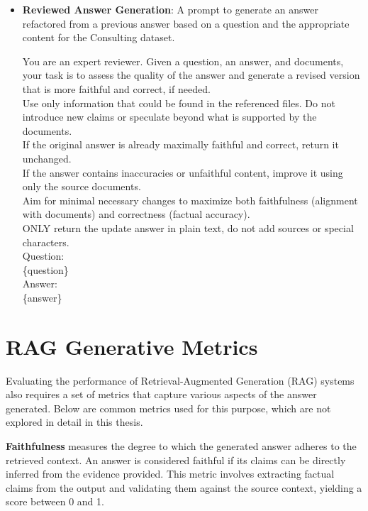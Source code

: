 \documentclass[12pt,twoside]{report}
\begin{document}
\begin{itemize}
    \item \textbf{Reviewed Answer Generation}: A prompt to generate an answer refactored from a previous answer based on a question and the appropriate content for the Consulting dataset.
    \begin{colquote}
    You are an expert reviewer. Given a question, an answer, and documents, your task is to assess the quality of the answer and generate a revised version that is more faithful and correct, if needed. \\
    Use only information that could be found in the referenced files. Do not introduce new claims or speculate beyond what is supported by the documents. \\
    If the original answer is already maximally faithful and correct, return it unchanged. \\
    If the answer contains inaccuracies or unfaithful content, improve it using only the source documents. \\
    Aim for minimal necessary changes to maximize both faithfulness (alignment with documents) and correctness (factual accuracy). \\
    ONLY return the update answer in plain text, do not add sources or special characters. \\

    Question: \\
    \{question\} \\

    Answer: \\
    \{answer\}
    \end{colquote}
\end{itemize}

\section{RAG Generative Metrics}
\label{sec:rag_generative_metrics}

Evaluating the performance of Retrieval-Augmented Generation (RAG) systems also requires a set of metrics that capture various aspects of the answer generated. Below are common metrics used for this purpose, which are not explored in detail in this thesis.

\textbf{Faithfulness} measures the degree to which the generated answer adheres to the retrieved context. An answer is considered faithful if its claims can be directly inferred from the evidence provided. This metric involves extracting factual claims from the output and validating them against the source context, yielding a score between 0 and 1. \\
\end{document}
